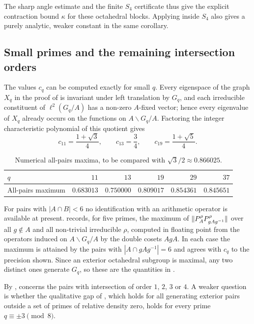 The sharp angle estimate and the finite $S_4$ certificate thus give the
explicit contraction bound $\kappa$ for these octahedral blocks. Applying
 inside $S_4$ also gives a purely analytic, weaker
constant in the same corollary.

\subsection{Small primes and the remaining intersection orders}
\label{subsec:allpairs}
The values $c_q$ can be computed exactly for small $q$. Every
eigenspace of the graph $X_q$ in the proof of
 is invariant under left translation by
$G_q$, and each irreducible constituent of $\ell^2(G_q/A)$ has a
non-zero $A$-fixed vector; hence every eigenvalue of $X_q$ already
occurs on the functions on $A\backslash G_q/A$. Factoring the integer
characteristic polynomial of this quotient gives
\[
 c_{11}=\frac{1+\sqrt3}{4},\qquad c_{13}=\frac34,\qquad
 c_{19}=\frac{1+\sqrt5}{4}.
\]

\begin{table}[!ht]
\centering\small
\begin{tabular}{lrrrrr}
\toprule
$q$ & $11$ & $13$ & $19$ & $29$ & $37$ \\
\midrule
All-pairs maximum & $0.683013$ & $0.750000$ & $0.809017$ & $0.854361$ & $0.845651$ \\
\bottomrule
\end{tabular}
\smallskip
\caption{Numerical all-pairs maxima, to be compared with $\sqrt3/2\approx0.866025$.}
\label{tab:allpairs-evidence}
\end{table}

For pairs with $|A\cap B|<6$ no identification with an arithmetic
operator is available at present.  records,
for five primes, the maximum of $\lVert P_A^\rho P_{gAg^{-1}}^\rho \rVert$ over
all $g\notin A$ and all non-trivial irreducible $\rho$, computed in
floating point from the operators induced on $A\backslash G_q/A$ by the
double cosets $AgA$. In each case the maximum is attained by the pairs
with $|A\cap gAg^{-1}|=6$ and agrees with $c_q$ to the precision shown.
Since an exterior octahedral subgroup is maximal, any two distinct ones
generate $G_q$, so these are the quantities in .

\begin{remark}[Questions]
\label{rem:octahedral-questions}
By ,  concerns the pairs
with intersection of order $1$, $2$, $3$ or $4$. A weaker question is
whether the qualitative gap of , which holds
for all generating exterior pairs outside a set of primes of relative
density zero, holds for every prime $q\equiv\pm3\pmod8$.
\end{remark}
